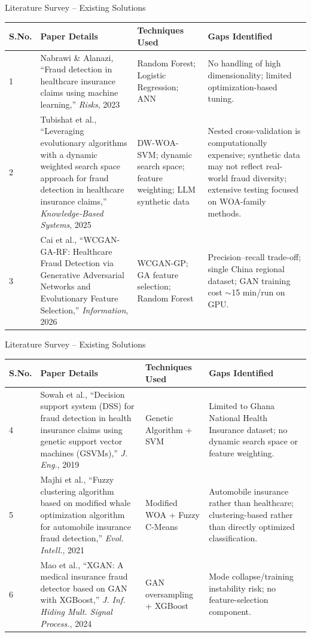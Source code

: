 \documentclass[aspectratio=169,11pt]{beamer}
\begin{document}
\begin{frame}{Literature Survey -- Existing Solutions}
\scriptsize
\begin{tabular}{p{}p{}p{}p{}}
\toprule
\textbf{S.No.} & \textbf{Paper Details} & \textbf{Techniques Used} & \textbf{Gaps Identified}\\
\midrule
1 & Nabrawi \& Alanazi, ``Fraud detection in healthcare insurance claims using machine learning,'' \emph{Risks}, 2023 &
Random Forest; Logistic Regression; ANN &
No handling of high dimensionality; limited optimization-based tuning.\\
2 & Tubishat et al., ``Leveraging evolutionary algorithms with a dynamic weighted search space approach for fraud detection in healthcare insurance claims,'' \emph{Knowledge-Based Systems}, 2025 &
DW-WOA-SVM; dynamic search space; feature weighting; LLM synthetic data &
Nested cross-validation is computationally expensive; synthetic data may not reflect real-world fraud diversity; extensive testing focused on WOA-family methods.\\
3 & Cai et al., ``WCGAN-GA-RF: Healthcare Fraud Detection via Generative Adversarial Networks and Evolutionary Feature Selection,'' \emph{Information}, 2026 &
WCGAN-GP; GA feature selection; Random Forest &
Precision--recall trade-off; single China regional dataset; GAN training cost $\sim$15 min/run on GPU.\\
\bottomrule
\end{tabular}
\end{frame}

\begin{frame}{Literature Survey -- Existing Solutions}
\scriptsize
\begin{tabular}{p{}p{}p{}p{}}
\toprule
\textbf{S.No.} & \textbf{Paper Details} & \textbf{Techniques Used} & \textbf{Gaps Identified}\\
\midrule
4 & Sowah et al., ``Decision support system (DSS) for fraud detection in health insurance claims using genetic support vector machines (GSVMs),'' \emph{J. Eng.}, 2019 &
Genetic Algorithm + SVM &
Limited to Ghana National Health Insurance dataset; no dynamic search space or feature weighting.\\
5 & Majhi et al., ``Fuzzy clustering algorithm based on modified whale optimization algorithm for automobile insurance fraud detection,'' \emph{Evol. Intell.}, 2021 &
Modified WOA + Fuzzy C-Means &
Automobile insurance rather than healthcare; clustering-based rather than directly optimized classification.\\
6 & Mao et al., ``XGAN: A medical insurance fraud detector based on GAN with XGBoost,'' \emph{J. Inf. Hiding Mult. Signal Process.}, 2024 &
GAN oversampling + XGBoost &
Mode collapse/training instability risk; no feature-selection component.\\
\bottomrule
\end{tabular}
\end{frame}
\end{document}
